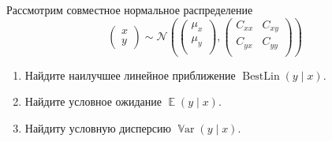 \documentclass[12pt]{article}
\DeclareMathOperator{\Var}{\mathbb{V}ar}
\DeclareMathOperator{\BestLin}{BestLin}
\DeclareMathOperator{\E}{\mathbb{E}}
\newcommand{\cN}{\mathcal{N}}
\begin{document}
\begin{problem}
Рассмотрим совместное нормальное распределение 
\[
\begin{pmatrix}
    x \\
    y 
\end{pmatrix} \sim \cN\left(
\begin{pmatrix}
    \mu_x \\
    \mu_y \\
\end{pmatrix}, 
\begin{pmatrix}
    C_{xx} & C_{xy} \\
    C_{yx} & C_{yy} \\
\end{pmatrix}\right)
\]
\begin{enumerate}
    \item Найдите наилучшее линейное приближение $\BestLin(y \mid x)$.
    \item Найдите условное ожидание $\E(y \mid x)$.    
    \item Найдиту условную дисперсию $\Var(y \mid x)$.
\end{enumerate}


\end{problem}
\end{document}
